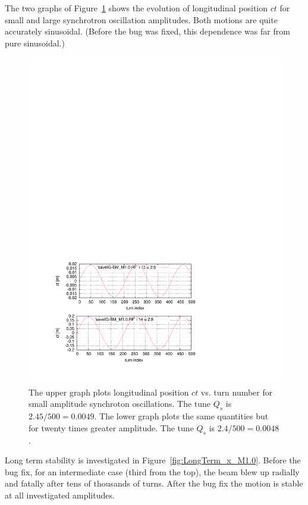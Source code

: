 \documentclass[]{article}
\begin{document}
\clearpage

The two graphs of Figure~\ref{fig:Q_sVsSynchAmplitude} 
shows the evolution of longitudinal position $ct$ for small
and large synchrotron oscillation amplitudes. Both
motions are quite accurately sinusoidal. (Before the bug
was fixed, this dependence was far from pure sinusoidal.) 
%
\begin{figure}[h]
\centering
\includegraphics[scale=1.3]{pdf/Q_sVsSynchAmplitude.pdf}
\caption{\label{fig:Q_sVsSynchAmplitude}The upper graph
plots longitudinal position $ct$ vs. turn number for
small amplitude synchroton oscillations. The tune $Q_s$
is $2.45/500=0.0049$. The lower graph
plots the same quantities but for twenty times greater
amplitude. The tune $Q_s$ is $2.4/500=0.0048$. 
}
\end{figure}
%

Long term stability is investigated in Figure~\ref{fig:LongTerm_x_M1.0}.
Before the bug fix, for an intermediate case (third from the top), the 
beam blew up radially and fatally after tens of thousands of turns. 
After the bug fix the motion is stable at all investigated amplitudes.
\end{document}
